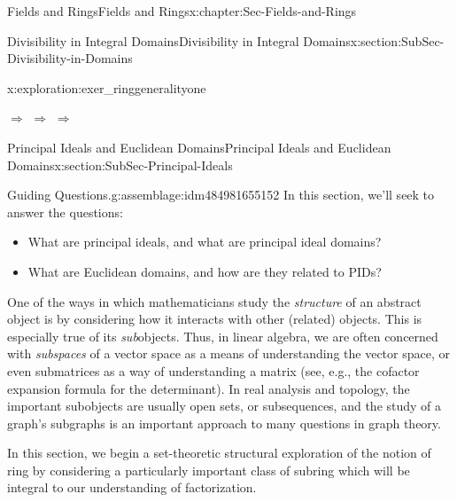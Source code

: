 \documentclass[oneside,10pt,]{book}
\numberwithin{equation}{section}
\begin{document}
\begin{chapterptx}{Fields and Rings}{}{Fields and Rings}{}{}{x:chapter:Sec-Fields-and-Rings}
\begin{sectionptx}{Divisibility in Integral Domains}{}{Divisibility in Integral Domains}{}{}{x:section:SubSec-Divisibility-in-Domains}
\begin{exploration}{}{x:exploration:exer_ringgeneralityone}
\par
\textunderscore{}\textunderscore{}\textunderscore{}\textunderscore{}\textunderscore{}\textunderscore{}\textunderscore{}\textunderscore{}\textunderscore{}\textunderscore{} \(\Rightarrow\) \textunderscore{}\textunderscore{}\textunderscore{}\textunderscore{}\textunderscore{}\textunderscore{}\textunderscore{}\textunderscore{}\textunderscore{}\textunderscore{} \(\Rightarrow\) \textunderscore{}\textunderscore{}\textunderscore{}\textunderscore{}\textunderscore{}\textunderscore{}\textunderscore{}\textunderscore{}\textunderscore{}\textunderscore{} \(\Rightarrow\) \textunderscore{}\textunderscore{}\textunderscore{}\textunderscore{}\textunderscore{}\textunderscore{}\textunderscore{}\textunderscore{}\textunderscore{}\textunderscore{}%
\end{exploration}
\end{sectionptx}
%
%
\typeout{************************************************}
\typeout{************************************************}
%
\begin{sectionptx}{Principal Ideals and Euclidean Domains}{}{Principal Ideals and Euclidean Domains}{}{}{x:section:SubSec-Principal-Ideals}
\begin{assemblage}{Guiding Questions.}{g:assemblage:idm484981655152}%
In this section, we'll seek to answer the questions: %
\begin{itemize}[label=\textbullet]
\item{}What are principal ideals, and what are principal ideal domains?%
\item{}What are Euclidean domains, and how are they related to PIDs?%
\end{itemize}
%
\end{assemblage}
One of the ways in which mathematicians study the \emph{structure} of an abstract object is by considering how it interacts with other (related) objects. This is especially true of its \emph{sub}objects. Thus, in linear algebra, we are often concerned with \emph{subspaces} of a vector space as a means of understanding the vector space, or even submatrices as a way of understanding a matrix (see, e.g., the cofactor expansion formula for the determinant). In real analysis and topology, the important subobjects are usually open sets, or subsequences, and the study of a graph's subgraphs is an important approach to many questions in graph theory.%
\par
In this section, we begin a set-theoretic structural exploration of the notion of ring by considering a particularly important class of subring which will be integral to our understanding of factorization.%

\end{sectionptx}
\end{chapterptx}
\end{document}
